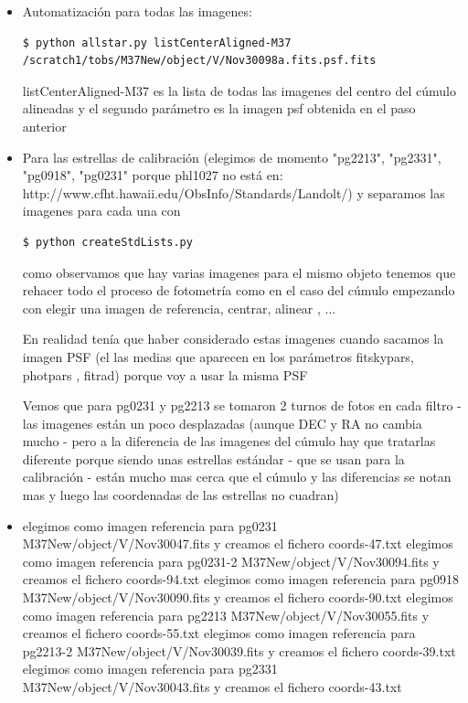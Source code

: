 \documentclass{article}
\begin{document}
\begin{itemize}
\item Automatización para todas las imagenes:
\begin{verbatim}
$ python allstar.py listCenterAligned-M37  /scratch1/tobs/M37New/object/V/Nov30098a.fits.psf.fits
\end{verbatim}
listCenterAligned-M37  es la lista de todas las imagenes del centro del cúmulo alineadas y el segundo parámetro es la imagen psf obtenida en el paso anterior

\item Para las estrellas de calibración (elegimos de momento  "pg2213", "pg2331", "pg0918", "pg0231" porque phl1027 no está en:
http://www.cfht.hawaii.edu/ObsInfo/Standards/Landolt/)
y separamos las imagenes para cada una con 

\begin{verbatim}
$ python createStdLists.py
\end{verbatim}

como observamos que hay varias imagenes para el mismo objeto tenemos que rehacer todo el proceso de fotometría como en el caso del 
cúmulo empezando con elegir una imagen de referencia, centrar, alinear , ...

En realidad tenía que haber considerado estas imagenes cuando sacamos la imagen PSF (el las medias que aparecen en los parámetros fitskypars, photpars , fitrad) porque voy a usar la misma PSF

Vemos que para pg0231 y pg2213 se tomaron 2 turnos de fotos en cada filtro - las imagenes están un poco desplazadas (aunque  DEC y RA no cambia mucho - pero a la diferencia de las imagenes del cúmulo hay que tratarlas diferente porque siendo unas estrellas estándar - que se usan para la calibración - están mucho mas cerca que el cúmulo y las diferencias se notan mas y luego las coordenadas de las estrellas no cuadran)
\item 
elegimos como imagen referencia para pg0231  M37New/object/V/Nov30047.fits y creamos el fichero coords-47.txt
elegimos como imagen referencia para pg0231-2  M37New/object/V/Nov30094.fits y creamos el fichero coords-94.txt
elegimos como imagen referencia para pg0918  M37New/object/V/Nov30090.fits y creamos el fichero coords-90.txt
elegimos como imagen referencia para pg2213  M37New/object/V/Nov30055.fits y creamos el fichero coords-55.txt
elegimos como imagen referencia para pg2213-2  M37New/object/V/Nov30039.fits y creamos el fichero coords-39.txt
elegimos como imagen referencia para pg2331  M37New/object/V/Nov30043.fits y creamos el fichero coords-43.txt


\end{itemize}
\end{document}
